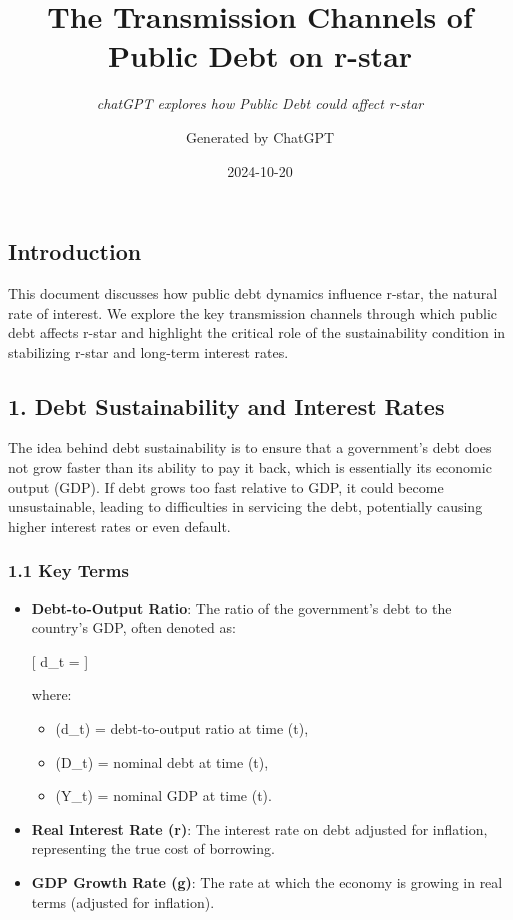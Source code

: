 \documentclass[
  letterpaper,
  DIV=11,
  numbers=noendperiod]{scrartcl}
\title{The Transmission Channels of Public Debt on r-star}
\subtitle{\emph{chatGPT explores how Public Debt could affect r-star}}
\author{Generated by ChatGPT}
\date{2024-10-20}
\providecommand{\tightlist}{%
  \setlength{\itemsep}{0pt}\setlength{\parskip}{0pt}}\usepackage{longtable,booktabs,array}
\begin{document}
\maketitle

\subsection{Introduction}\label{introduction}

This document discusses how public debt dynamics influence r-star, the
natural rate of interest. We explore the key transmission channels
through which public debt affects r-star and highlight the critical role
of the sustainability condition in stabilizing r-star and long-term
interest rates.

\subsection{1. Debt Sustainability and Interest
Rates}\label{debt-sustainability-and-interest-rates}

The idea behind debt sustainability is to ensure that a government's
debt does not grow faster than its ability to pay it back, which is
essentially its economic output (GDP). If debt grows too fast relative
to GDP, it could become unsustainable, leading to difficulties in
servicing the debt, potentially causing higher interest rates or even
default.

\subsubsection{1.1 Key Terms}\label{key-terms}

\begin{itemize}
\item
  \textbf{Debt-to-Output Ratio}: The ratio of the government's debt to
  the country's GDP, often denoted as:

  {[} d\_t =  {]}

  where:

  \begin{itemize}
  \tightlist
  \item
    (d\_t) = debt-to-output ratio at time (t),
  \item
    (D\_t) = nominal debt at time (t),
  \item
    (Y\_t) = nominal GDP at time (t).
  \end{itemize}
\item
  \textbf{Real Interest Rate (r)}: The interest rate on debt adjusted
  for inflation, representing the true cost of borrowing.
\item
  \textbf{GDP Growth Rate (g)}: The rate at which the economy is growing
  in real terms (adjusted for inflation).
\end{itemize}
\end{document}
